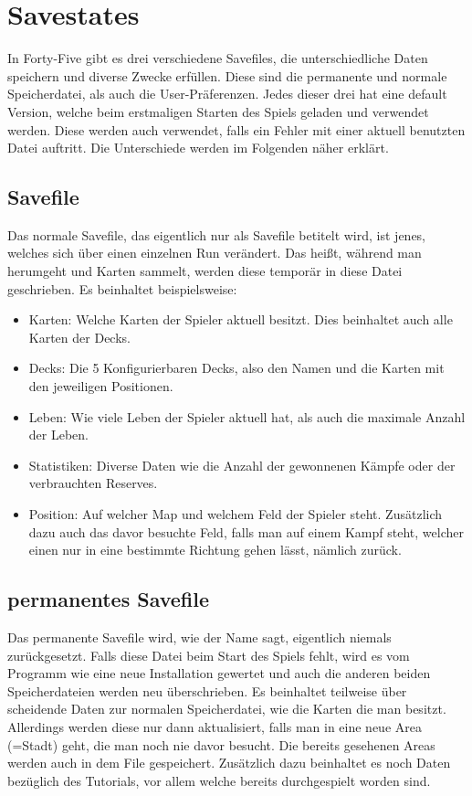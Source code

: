 
\renewcommand{\kapitelautor}{Autor: Felix Zwickelstorfer}
\section{Savestates}\label{sec:savestates}
\renewcommand{\kapitelautor}{Autor: Felix Zwickelstorfer}

In Forty-Five gibt es drei verschiedene Savefiles, die unterschiedliche Daten speichern und diverse Zwecke erfüllen.
Diese sind die permanente und normale Speicherdatei, als auch die User-Präferenzen.
Jedes dieser drei hat eine default Version, welche beim erstmaligen Starten des Spiels geladen und verwendet werden.
Diese werden auch verwendet, falls ein Fehler mit einer aktuell benutzten Datei auftritt.
Die Unterschiede werden im Folgenden näher erklärt.


\subsection{Savefile}\label{subsec:savefile}

Das normale Savefile, das eigentlich nur als Savefile betitelt wird, ist jenes, welches sich über einen einzelnen Run verändert.
Das heißt, während man herumgeht und Karten sammelt, werden diese temporär in diese Datei geschrieben.
Es beinhaltet beispielsweise:
\begin{itemize}
    \item Karten: Welche Karten der Spieler aktuell besitzt.
     Dies beinhaltet auch alle Karten der Decks.
    \item Decks: Die 5 Konfigurierbaren Decks, also den Namen und die Karten mit den jeweiligen Positionen.
    \item Leben: Wie viele Leben der Spieler aktuell hat, als auch die maximale Anzahl der Leben.
    \item Statistiken: Diverse Daten wie \zB die Anzahl der gewonnenen Kämpfe oder der verbrauchten Reserves.
    \item Position: Auf welcher Map und welchem Feld der Spieler steht.
    Zusätzlich dazu auch das davor besuchte Feld, falls man auf einem Kampf steht, welcher einen nur in eine bestimmte Richtung gehen lässt, nämlich zurück.
\end{itemize}


\subsection{permanentes Savefile}\label{subsec:perma-savefile}
Das permanente Savefile wird, wie der Name sagt, eigentlich niemals zurückgesetzt.
Falls diese Datei beim Start des Spiels fehlt, wird es vom Programm wie eine neue Installation gewertet und auch die anderen beiden Speicherdateien werden neu überschrieben.
Es beinhaltet teilweise über scheidende Daten zur normalen Speicherdatei, wie die Karten die man besitzt.
Allerdings werden diese nur dann aktualisiert, falls man in eine neue Area (=Stadt) geht, die man noch nie davor besucht.
Die bereits gesehenen Areas werden auch in dem File gespeichert.
Zusätzlich dazu beinhaltet es noch Daten bezüglich des Tutorials, vor allem welche bereits durchgespielt worden sind.

